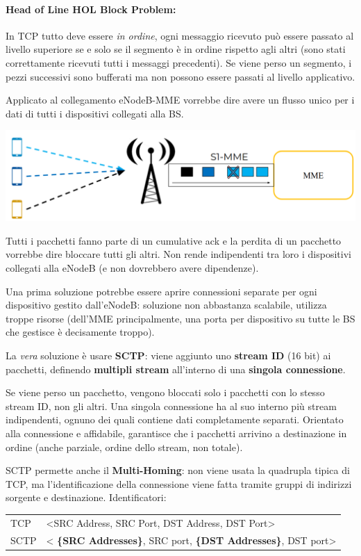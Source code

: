 \paragraph{Head of Line HOL Block Problem:} In TCP tutto deve essere \textit{in ordine}, ogni messaggio ricevuto può essere passato al livello superiore se e solo se il segmento è in ordine rispetto agli altri (sono stati correttamente ricevuti tutti i messaggi precedenti). Se viene perso un segmento, i pezzi successivi sono bufferati ma non possono essere passati al livello applicativo.

Applicato al collegamento eNodeB-MME vorrebbe dire avere un flusso unico per i dati di tutti i dispositivi collegati alla BS. 
\begin{center}
	\includegraphics[width=0.7\linewidth]{img/4g/holprob1}
\end{center}

Tutti i pacchetti fanno parte di un cumulative ack e la perdita di un pacchetto vorrebbe dire bloccare tutti gli altri. Non rende indipendenti tra loro i dispositivi collegati alla eNodeB (e non dovrebbero avere dipendenze).

Una prima soluzione potrebbe essere aprire connessioni separate per ogni dispositivo gestito dall'eNodeB: soluzione non abbastanza scalabile, utilizza troppe risorse (dell'MME principalmente, una porta per dispositivo su tutte le BS che gestisce è decisamente troppo).

La \textit{vera} soluzione è usare \textbf{SCTP}: viene aggiunto uno \textbf{stream ID} (16 bit) ai pacchetti, definendo \textbf{multipli stream} all'interno di una \textbf{singola connessione}. 

Se viene perso un pacchetto, vengono bloccati solo i pacchetti con lo stesso stream ID, non gli altri. Una singola connessione ha al suo interno più stream indipendenti, ognuno dei quali contiene dati completamente separati. Orientato alla connessione e affidabile, garantisce che i pacchetti arrivino a destinazione in ordine (anche parziale, ordine dello stream, non totale).

SCTP permette anche il \textbf{Multi-Homing}: non viene usata la quadrupla tipica di TCP, ma l'identificazione della connessione viene fatta tramite gruppi di indirizzi sorgente e destinazione. Identificatori:
\begin{center}
	\begin{tabular}{l l}
		TCP & <SRC Address, SRC Port, DST Address, DST Port> \\
		SCTP & < \textbf{\{SRC Addresses\}}, SRC port, \textbf{\{DST Addresses\}}, DST port>
	\end{tabular}
\end{center}

